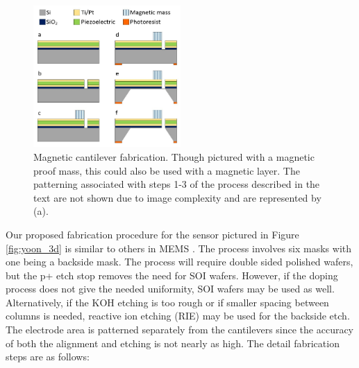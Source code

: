 \begin{figure}[H]
\centering
\includegraphics[width=0.5\textwidth]{yoon_process}
\caption{Magnetic cantilever fabrication. Though pictured with a magnetic proof mass, this could also be used with a magnetic layer. The patterning associated with steps 1-3 of the process described in the text are not shown due to image complexity and are represented by (a).}
\label{fig:yoon_process}
\end{figure}

Our proposed fabrication procedure for the sensor pictured in Figure \ref{fig:yoon_3d} is similar to others in MEMS \cite{shen2008design}. The process involves six masks with one being a backside mask. The process will require double sided polished wafers, but the p+ etch stop removes the need for SOI wafers. However, if the doping process does not give the needed uniformity, SOI wafers may be used as well. Alternatively, if the KOH etching is too rough or if smaller spacing between columns is needed, reactive ion etching (RIE) may be used for the backside etch. The electrode area is patterned separately from the cantilevers since the accuracy of both the alignment and etching is not nearly as high. The detail fabrication steps are as follows:


